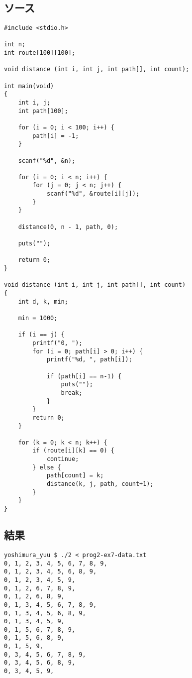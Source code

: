 \documentclass[11pt,a4paper,a4j]{jsarticle}
\begin{document}
\clearpage
\section{}
\subsection{ソース}
\begin{lstlisting}
#include <stdio.h>

int n;
int route[100][100];

void distance (int i, int j, int path[], int count);

int main(void)
{
	int i, j;
	int path[100];

	for (i = 0; i < 100; i++) {
		path[i] = -1;
	}

	scanf("%d", &n);

	for (i = 0; i < n; i++) {
		for (j = 0; j < n; j++) {
			scanf("%d", &route[i][j]);
		}
	}

	distance(0, n - 1, path, 0);

	puts("");

	return 0;
}

void distance (int i, int j, int path[], int count)
{
	int d, k, min;

	min = 1000;

	if (i == j) {
		printf("0, ");
		for (i = 0; path[i] > 0; i++) {
			printf("%d, ", path[i]);
			
			if (path[i] == n-1) {
				puts("");
				break;
			}
		}
		return 0;
	}

	for (k = 0; k < n; k++) {
		if (route[i][k] == 0) {
			continue;
		} else {
			path[count] = k;
			distance(k, j, path, count+1);
		}
	}
}
\end{lstlisting}

\subsection{結果}
\begin{shadebox}
\begin{verbatim}
yoshimura_yuu $ ./2 < prog2-ex7-data.txt
0, 1, 2, 3, 4, 5, 6, 7, 8, 9, 
0, 1, 2, 3, 4, 5, 6, 8, 9, 
0, 1, 2, 3, 4, 5, 9, 
0, 1, 2, 6, 7, 8, 9, 
0, 1, 2, 6, 8, 9, 
0, 1, 3, 4, 5, 6, 7, 8, 9, 
0, 1, 3, 4, 5, 6, 8, 9, 
0, 1, 3, 4, 5, 9, 
0, 1, 5, 6, 7, 8, 9, 
0, 1, 5, 6, 8, 9, 
0, 1, 5, 9, 
0, 3, 4, 5, 6, 7, 8, 9, 
0, 3, 4, 5, 6, 8, 9, 
0, 3, 4, 5, 9, 
\end{verbatim}
\end{shadebox}
\clearpage
\end{document}
